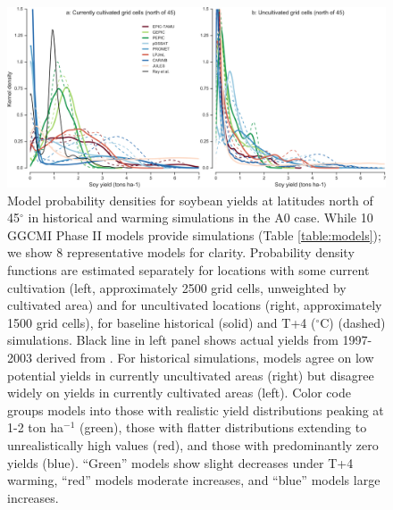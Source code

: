 \documentclass[gmd, manuscript]{copernicus} %
\begin{document}
\begin{figure}[ht]
\centering
  \includegraphics[width=15cm]{figures/soy_highlats.png}
  \caption{
  Model probability densities for soybean yields at latitudes north of 45$^\circ$ in historical and warming simulations in the A0 case. 
  While 10 GGCMI Phase II models provide simulations (Table \ref{table:models}); we show 8 representative models for clarity.
  Probability density functions are estimated separately for locations with some current cultivation (left, approximately 2500 grid cells, unweighted by cultivated area) and for uncultivated locations (right, approximately 1500 grid cells), for baseline historical (solid) and T+4 ($^{\circ}$C) (dashed) simulations. 
  Black line in left panel shows actual yields from 1997-2003 derived from \cite{Ray2012}. 
  For historical simulations, models agree on low potential yields in currently uncultivated areas (right) but disagree widely on yields in currently cultivated areas (left). 
  Color code groups models into those with realistic yield distributions peaking at 1-2 ton ha$^{-1}$ (green), those with flatter distributions extending to unrealistically high values (red), and those with predominantly zero yields (blue). 
  ``Green'' models show slight decreases under T+4 warming, ``red'' models moderate increases, and ``blue'' models large increases. 
  }
\label{fig:highlat}
\end{figure}
\end{document}
